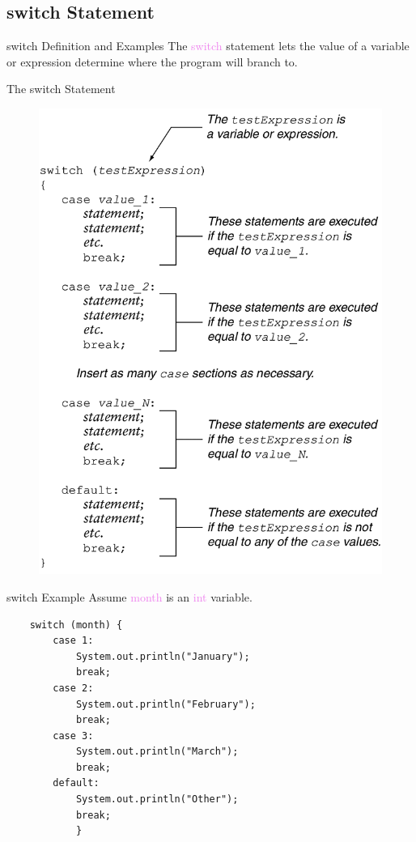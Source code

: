 \documentclass[11pt]{beamer}
\newcommand{\violet}[1]{\textcolor{violet}{#1}}
\begin{document}
\subsection{switch Statement}
\begin{frame}{switch Definition and Examples}
    The \violet{switch} statement lets the value of a variable or expression determine where the program will branch to.
\end{frame}

\begin{frame}{The switch Statement}
    \noindent 
    \begin{figure}[H]
    \centering
    \includegraphics[scale=0.2]{Images/chapter03_switchStatement.png}
    \end{figure}
\end{frame}


\begin{frame}[fragile]{switch Example}
    Assume \violet{month} is an \violet{int} variable.
    \begin{lstlisting}
    switch (month) {
        case 1:
            System.out.println("January");
            break;
        case 2:
            System.out.println("February");
            break;
        case 3:
            System.out.println("March");
            break;
        default:
            System.out.println("Other");
            break;
            }
    \end{lstlisting}
\end{frame}
\end{document}
